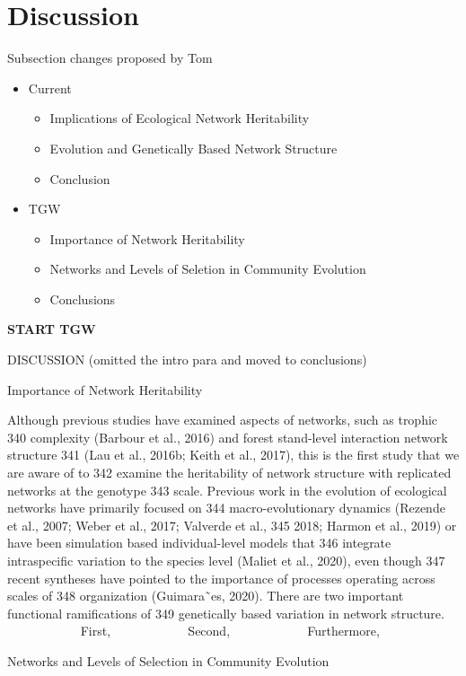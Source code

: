 \documentclass[fleqn,12pt]{olplainarticle}
\begin{document}
\section*{Discussion}

Subsection changes proposed by Tom

\begin{itemize}
\item Current
  \begin{itemize}
  \item Implications of Ecological Network Heritability
  \item Evolution and Genetically Based Network Structure
  \item Conclusion
  \end{itemize}
\item TGW
  \begin{itemize}
  \item Importance of Network Heritability
  \item Networks and Levels of Seletion in Community Evolution
  \item Conclusions
  \end{itemize}
\end{itemize}


\textbf{START TGW}

DISCUSSION (omitted the intro para and moved to conclusions)

Importance of Network Heritability

Although previous studies have examined aspects of networks, such as
trophic
340 complexity (Barbour et al., 2016) and forest stand-level
interaction network structure
341 (Lau et al., 2016b; Keith et al., 2017), this is the first study
that we are aware of to
342 examine the heritability of network structure with replicated
networks at the genotype
343 scale. Previous work in the evolution of ecological networks have
primarily focused on
344 macro-evolutionary dynamics (Rezende et al., 2007; Weber et al.,
2017; Valverde et al.,
345 2018; Harmon et al., 2019) or have been simulation based
individual-level models that
346 integrate intraspecific variation to the species level (Maliet et
al., 2020), even though
347 recent syntheses have pointed to the importance of processes
operating across scales of
348 organization (Guimara˜es, 2020). There are two important
functional ramifications of
349 genetically based variation in network structure.
            First,
            Second,
            Furthermore,


Networks and Levels of Selection in Community Evolution
\end{document}
